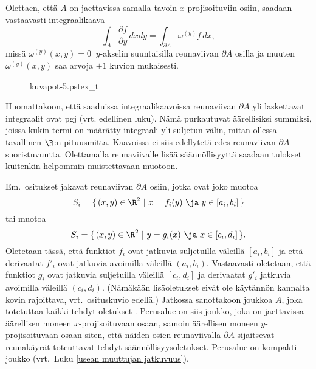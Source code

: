 Olettaen, että $A$ on jaettavissa samalla tavoin $x$-projisoituviin osiin, saadaan vastaavasti
integraalikaava
\[
\int_A \frac{\partial f}{\partial y}\,dxdy=\int_{\partial A} \omega^{(y)}f\,dx,
\]
missä $\omega^{(y)}(x,y)=0\ $ $y$-akselin suuntaisilla reunaviivan $\partial A$ osilla ja muuten
$\omega^{(y)}(x,y)$ saa arvoja $\pm 1$ kuvion mukaisesti.
\begin{figure}[H]
\begin{center}
{kuvapot-5.pstex_t}
\end{center}
\end{figure}
Huomattakoon, että saaduissa integraalikaavoissa reunaviivan $\partial A$ yli laskettavat
integraalit ovat pgj (vrt. edellinen luku). Nämä purkautuvat
äärellisiksi summiksi, joissa kukin termi on määrätty integraali yli suljetun välin, mitan
ollessa tavallinen $\R$:n pituusmitta. Kaavoissa ei siis edellytetä edes reunaviivan
$\partial A$ suoristuvuutta. Olettamalla reunaviivalle lisää säännöllisyyttä saadaan tulokset
kuitenkin helpommin muistettavaan muotoon. 

Em.\ ositukset jakavat reunaviivan $\partial A$ osiin, jotka ovat joko muotoa
\[
S_i=\{\,(x,y)\in\R^2 \ | \ x=f_i(y) \ \ja \ y\in [a_i,b_i]\,\}
\]
tai muotoa
\[
S_i=\{\,(x,y)\in\R^2 \ | \ y=g_i(x) \ \ja \ x\in [c_i,d_i]\,\}.
\]
Oletetaan tässä, että funktiot $f_i$ ovat jatkuvia suljetuilla väleillä $[a_i,b_i]$ ja että
derivaatat $f'_i$ ovat jatkuvia avoimilla väleillä $(a_i,b_i)$. Vastaavasti oletetaan, että
funktiot $g_i$ ovat jatkuvia suljetuilla väleillä $[c_i,d_i]$ ja derivaatat $g'_i$ jatkuvia
avoimilla väleillä $(c_i,d_i)$. (Nämäkään lisäoletukset eivät ole käytännön kannalta kovin
rajoittava, vrt.\ osituskuvio edellä.) Jatkossa sanottakoon joukkoa $A$, joka totetuttaa kaikki
%
tehdyt oletukset . Perusalue on siis joukko, joka on jaettavissa äärellisen
moneen $x$-projisoituvaan osaan, samoin äärellisen moneen $y$-projisoituvaan osaan siten, että
näiden osien reunaviivalla $\partial A$ sijaitsevat reunakäyrät toteuttavat tehdyt
säännöllisyysoletukset. Perusalue on kompakti joukko
(vrt.\ Luku \ref{usean muuttujan jatkuvuus}).
 
